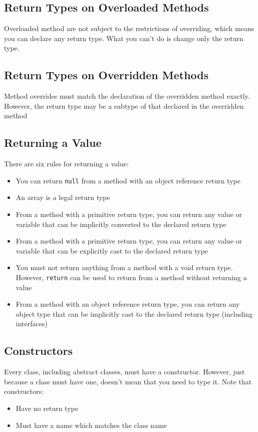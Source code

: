 \subsection{Return Types on Overloaded Methods}
Overloaded method are not subject to the restrictions of overriding, which 
means you can declare any return type. What you can't do is change only the 
return type.

\subsection{Return Types on Overridden Methods}
Method overrides must match the declaration of the overridden method exactly.  
However, the return type may be a subtype of that declared in the overridden 
method

\subsection{Returning a Value}
There are six rules for returning a value:
\begin{itemize}
    \item You can return \verb#null# from a method with an object reference 
    return type
    \item An array is a legal return type
    \item From a method with a primitive return type, you can return any value 
    or variable that can be implicitly converted to the declared return type
    \item From a method with a primitive return type, you can return any value 
    or variable that can be explicitly cast to the declared return type
    \item You must not return anything from a method with a void return type.  
    However, \verb#return# can be used to return from a method without 
    returning a value
    \item From a method with an object reference return type, you can return 
    any object type that can be implicitly cast to the declared return type 
    (including interfaces)
\end{itemize}

\subsection{Constructors}
Every class, including abstract classes, must have a constructor. However, just 
because a class must have one, doesn't mean that you need to type it. Note that 
constructors:
\begin{itemize}
    \item Have no return type
    \item Must have a name which matches the class name
\end{itemize}

